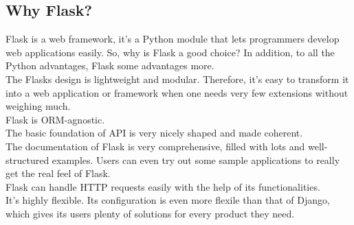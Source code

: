 \documentclass[a4paper,12pt]{article}
\begin{document}
\subsection*{Why Flask?}
Flask is a web framework, it’s a Python module that lets programmers develop web applications easily.
So, why is Flask a good choice? In addition, to all the Python advantages, Flask some advantages more.\\
The Flasks design is lightweight and modular. Therefore, it's easy to transform it into a web application or framework when one needs very few extensions without weighing much.\\
Flask is ORM-agnostic.\\
The basic foundation of API is very nicely shaped and made coherent.\\
The documentation of Flask is very comprehensive, filled with lots and well-structured examples. Users can even try out some sample applications to really get the real feel of Flask.\\
Flask can handle HTTP requests easily with the help of its functionalities.\\
It's highly flexible. Its configuration is even more flexile than that of Django, which gives its users plenty of solutions for every product they need.
\end{document}
